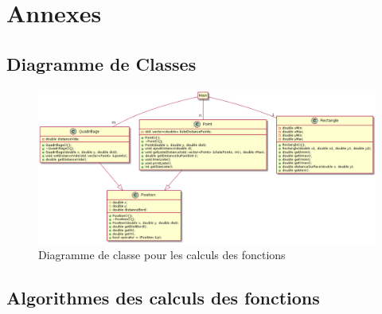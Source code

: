 \documentclass[stage2a]{tnreport}
\begin{document}
\listoftables
\cleardoublepage

\lstlistoflistings
\cleardoublepage

\printglossaries
{}
\cleardoublepage


\appendix
\part*{Annexes}
\cleardoublepage

\chapter{Diagramme de Classes}
\begin{figure}[h]
 \centering
  \includegraphics[scale=0.43]{figures/diagrammeClasses.png}
  \caption{Diagramme de classe pour les calculs des fonctions}
  \label{fig:diagClasse}
\end{figure}
\cleardoublepage


\chapter{Algorithmes des calculs des fonctions}
\end{document}
